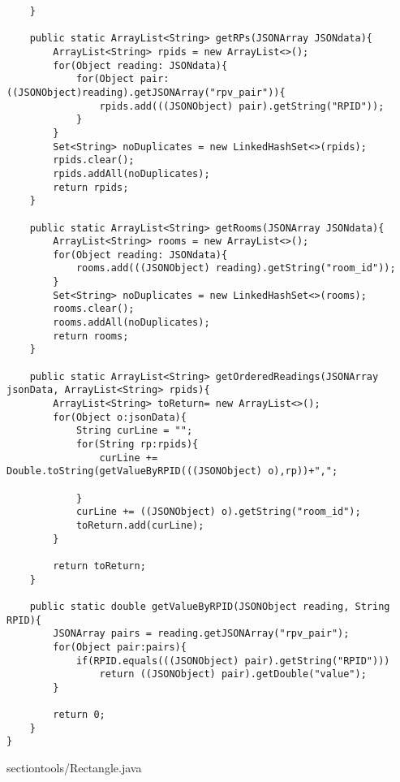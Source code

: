 \documentclass{article}
\begin{document}
\begin{lstlisting}
    }

    public static ArrayList<String> getRPs(JSONArray JSONdata){
        ArrayList<String> rpids = new ArrayList<>();
        for(Object reading: JSONdata){
            for(Object pair: ((JSONObject)reading).getJSONArray("rpv_pair")){
                rpids.add(((JSONObject) pair).getString("RPID"));
            }
        }
        Set<String> noDuplicates = new LinkedHashSet<>(rpids);
        rpids.clear();
        rpids.addAll(noDuplicates);
        return rpids;
    }

    public static ArrayList<String> getRooms(JSONArray JSONdata){
        ArrayList<String> rooms = new ArrayList<>();
        for(Object reading: JSONdata){
            rooms.add(((JSONObject) reading).getString("room_id"));
        }
        Set<String> noDuplicates = new LinkedHashSet<>(rooms);
        rooms.clear();
        rooms.addAll(noDuplicates);
        return rooms;
    }

    public static ArrayList<String> getOrderedReadings(JSONArray jsonData, ArrayList<String> rpids){
        ArrayList<String> toReturn= new ArrayList<>();
        for(Object o:jsonData){
            String curLine = "";
            for(String rp:rpids){
                curLine += Double.toString(getValueByRPID(((JSONObject) o),rp))+",";

            }
            curLine += ((JSONObject) o).getString("room_id");
            toReturn.add(curLine);
        }

        return toReturn;
    }

    public static double getValueByRPID(JSONObject reading, String RPID){
        JSONArray pairs = reading.getJSONArray("rpv_pair");
        for(Object pair:pairs){
            if(RPID.equals(((JSONObject) pair).getString("RPID")))
                return ((JSONObject) pair).getDouble("value");
        }

        return 0;
    }
}
\end{lstlisting}
\newpage
section{tools/Rectangle.java}
\end{document}
